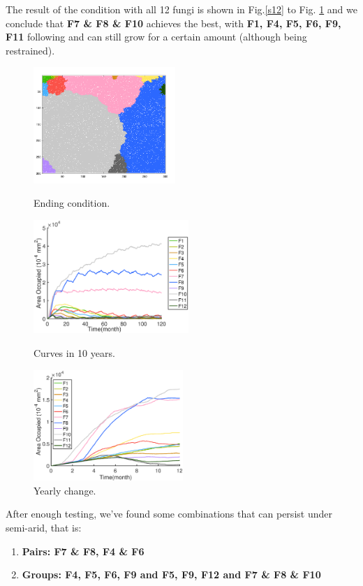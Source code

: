 \documentclass[a4paper,12pt]{article}
\begin{document}
The result of the condition with all 12 fungi is shown in Fig.\ref{s12} to Fig. \ref{ys12} and we conclude that \textbf{F7 \& F8 \& F10 }achieves the best, with \textbf{F1, F4, F5, F6, F9, F11} following and can still grow for a certain amount (although being restrained).
\begin{figure}[H]
	\begin{minipage}{29ex}
	\includegraphics[height=4.4cm]{./formal/semi-arid/12[1].png}
	\caption{Ending condition.}
	\label{s12}
\end{minipage}   
\begin{minipage}{31ex}
	\includegraphics[height=4.3cm]{./formal/semi-arid/12[2].eps}
	\caption{Curves in 10 years.}
	\label{s}
\end{minipage}
\begin{minipage}{29ex}
 \quad
	\includegraphics[height=4.2cm]{./formal/semi-arid/12[3].eps}
	\caption{Yearly change.}
	\label{ys12}
\end{minipage} 
\end{figure}

After enough testing, we've found some combinations that can persist under semi-arid, that is: 
\begin{enumerate}
\setlength{\itemsep}{0ex} %
\item \textbf{Pairs: F7 \& F8, F4 \& F6}
\item \textbf{Groups: F4, F5, F6, F9 and F5, F9, F12 and F7 \& F8 \& F10}
\end{enumerate}
\end{document}
